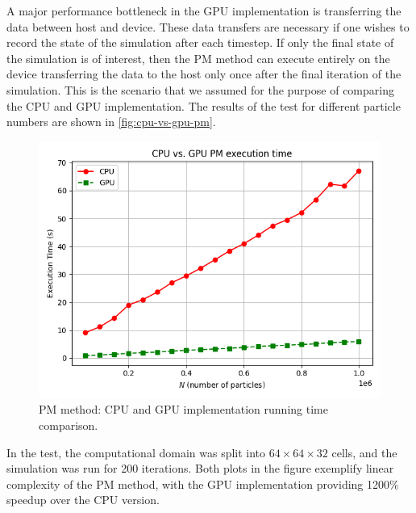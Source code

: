 A major performance bottleneck in the GPU implementation is transferring the data between host and device.
These data transfers are necessary if one wishes to record the state of the simulation after each timestep.
If only the final state of the simulation is of interest, then the PM method can execute entirely on the device transferring the data to the host only once after the final iteration of the simulation.
This is the scenario that we assumed for the purpose of comparing the CPU and GPU implementation.
The results of the test for different particle numbers are shown in \autoref{fig:cpu-vs-gpu-pm}.
\begin{figure}[htp]
    \centering
    \includegraphics[scale=0.6]{img/cpu-vs-gpu.png}
    \caption{PM method: CPU and GPU implementation running time comparison.}
    \label{fig:cpu-vs-gpu-pm}
\end{figure}
In the test, the computational domain was split into $64\times 64 \times 32$ cells, and the simulation was run for 200 iterations.
Both plots in the figure exemplify linear complexity of the PM method, with the GPU implementation providing 1200\% speedup over the CPU version.